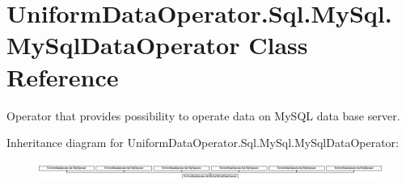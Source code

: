 \hypertarget{class_uniform_data_operator_1_1_sql_1_1_my_sql_1_1_my_sql_data_operator}{}\section{Uniform\+Data\+Operator.\+Sql.\+My\+Sql.\+My\+Sql\+Data\+Operator Class Reference}
\label{class_uniform_data_operator_1_1_sql_1_1_my_sql_1_1_my_sql_data_operator}


Operator that provides possibility to operate data on My\+S\+QL data base server.  


Inheritance diagram for Uniform\+Data\+Operator.\+Sql.\+My\+Sql.\+My\+Sql\+Data\+Operator\+:\begin{figure}[H]
\begin{center}
\leavevmode
\includegraphics[height=0.590717cm]{d5/d34/class_uniform_data_operator_1_1_sql_1_1_my_sql_1_1_my_sql_data_operator}
\end{center}
\end{figure}
